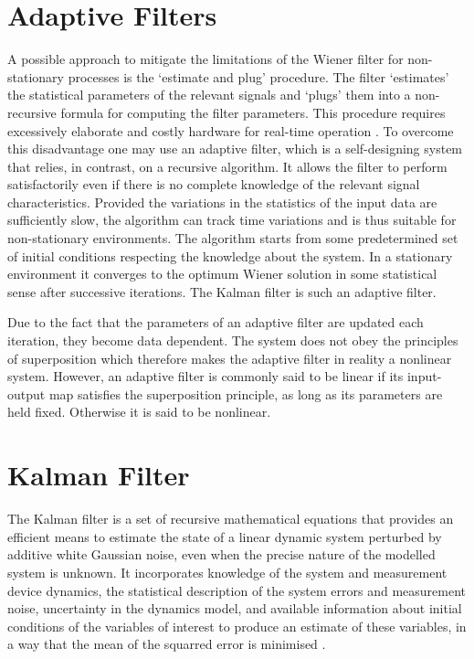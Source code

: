 \section{Adaptive Filters}

A possible approach to mitigate the limitations of the Wiener filter for non-stationary processes is the `estimate and plug' procedure. The filter `estimates' the statistical parameters of the relevant signals and `plugs' them into a non-recursive formula for computing the filter parameters. This procedure requires excessively elaborate and costly hardware for real-time operation \cite{haykin2002adaptive}. To overcome this disadvantage one may use an adaptive filter, which is a self-designing system that relies, in contrast, on a recursive algorithm. It allows the filter to perform satisfactorily even if there is no complete knowledge of the relevant signal characteristics. Provided the variations in the  statistics of the input data are sufficiently slow, the algorithm can track time variations and is thus suitable for non-stationary environments. The algorithm starts from some predetermined set of initial conditions respecting the knowledge about the system. In a stationary environment it converges to the optimum Wiener solution in some statistical sense after successive iterations. The Kalman filter is such an adaptive filter.

Due to the fact that the parameters of an adaptive filter are updated each iteration, they become data dependent. The system does not obey the principles of superposition which therefore makes the adaptive filter in reality a nonlinear system. However, an adaptive filter is commonly said to be linear if its input-output map satisfies the superposition principle, as long as its parameters are held fixed. Otherwise it is said to be nonlinear.


\section{Kalman Filter}

The Kalman filter is a set of recursive mathematical equations that provides an efficient means to estimate the state of a linear dynamic system perturbed by additive white Gaussian noise, even when the precise nature of the modelled system is unknown. It incorporates knowledge of the system and measurement device dynamics, the statistical description of the system errors and measurement noise, uncertainty in the dynamics model, and available information about initial conditions of the variables of interest to produce an estimate of these variables, in a way that the mean of the squarred error is minimised \cite{Maybeck79}. 


